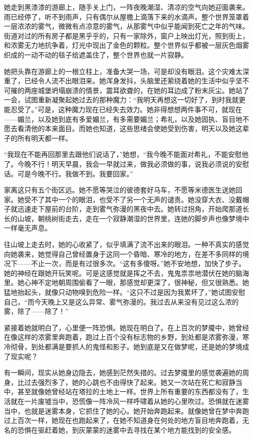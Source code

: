\par 她走到黑漆漆的游廊上，随手关上门，一阵夜晚潮湿、清凉的空气向她迎面袭来。雨已经停了，听不到雨声，只有偶尔从屋檐上滴落下来的水滴声。整个世界笼罩着一层浓浓的雾气，微微有点凉意的雾气，从那雾气中似乎能闻到死亡之年的气味。街道对过的所有房子都是黑乎乎的，只有一家除外，窗户上映出灯光，照到街上，和浓雾无力地抗争着，灯光中现出了金色的颗粒。整个世界似乎都被一层灰色烟雾织成的一动不动的毯子给遮盖住了，整个世界也就一片寂静。
\par 她把头靠在游廊上的一根立柱上，准备大哭一场，可是却没有眼泪。这个灾难太深重了，已经令人流不出眼泪来。她浑身发抖，头脑里还萦绕着她的生活中似乎坚不可摧的两座城堡坍塌崩溃的情景，震耳欲聋的，在她的耳边成了粉末灰尘。她站了一会，试图重新凝聚起她过去的那种魔力：“我明天再想这一切好了，到时我就更能忍受了。”可是，这种魔力现在已经失去效力。她非得想想两件事不可，就现在——媚兰，以及她到底有多爱媚兰，有多需要媚兰；希礼，以及她固执、盲目地不愿去看清他的本来面目。而她也知道，这些思绪会使她受到伤害，明天以及她这辈子的所有明天都一样。
\par “我现在不能再回那里去跟他们说话了，”她想，“我今晚不能面对希礼，不能安慰他了。今晚不行！明天早晨，我会一早就过来，做我必须做的事，说我必须说的安慰话。可是今晚不行。我做不到。我要回家。”
\par 家离这只有五个街区远。她不愿等哭泣的彼德套好马车，不愿等米德医生送她回家。她受不了其中一个的眼泪，也受不了另一个无声的谴责。她没穿大衣、没戴帽子就迅速走下屋前的台阶，走到雾气弥漫的黑夜中去。她转过拐角，开始爬那道长长的山坡，朝桃树街走去，走在一个寂静潮湿的世界里，连她的脚步声也像梦境中一样毫无声息。
\par 往山坡上走去时，她的心收紧了，似乎填满了流不出来的眼泪。一种不真实的感觉向她袭来，她觉得自己曾经置身于这同一个昏暗、寒冷的地方，在差不多同样的境况下——不止一次，而是有过很多次。“这有多傻呀。”她不安地想，加快了步子。她的神经在跟她开玩笑呢。可是这感觉就是挥之不去，鬼鬼祟祟地潜伏在她的脑海里。她心神不定地朝周围偷看了一眼，那感觉却更深了，很神秘，但又很熟悉。她猛地抬起头，就像只动物嗅到危险一样。“这只不过是因为我累坏了，”她试图安慰自己，“而今天晚上又是这么异常、雾气弥漫的。我过去从来没有见过这么浓的雾，除了——除了！”
\par 紧接着她就明白了，心里便一阵恐惧。她现在明白了。在上百次的梦魇中，她曾经在像这样的浓雾里奔跑着，跑过上百个没有标志物的乡野，到处都是浓雾弥漫，寒冷彻骨，到处都满是要抓人的鬼怪和影子。她到底是又在做梦呢，还是她的梦境成了现实呢？
\par 有一瞬间，现实从她身边隐去，她感到茫然失措的。过去梦魇里的感觉袭遍她的周身，比过去强烈多了，她的心跳也不由得快了起来。她又一次站在死亡和寂静当中，甚至就像她曾经站在塔拉的土地上一样。世界上所有重要的东西都没有了，生活就在一片废墟当中，恐慌像一阵冷风一样呼啸着从她的心里吹过。恐惧就在迷雾当中，也就是迷雾本身，它抓住了她的心。她开始奔跑起来。就像她曾在梦中奔跑过上百次一样，她现在也跑起来了，在她不知道身在何处的地方盲目地奔跑着，无名的恐惧在驱赶着她，到灰蒙蒙的迷雾中去寻找在某个地方能找到的安全感。
